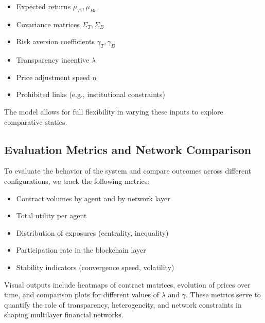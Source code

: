 \begin{itemize}
    \item Expected returns \( \mu_{Ti}, \mu_{Bi} \)
    \item Covariance matrices \( \Sigma_T, \Sigma_B \)
    \item Risk aversion coefficients \( \gamma_T, \gamma_B \)
    \item Transparency incentive \( \lambda \)
    \item Price adjustment speed \( \eta \)
    \item Prohibited links (e.g., institutional constraints)
\end{itemize}

The model allows for full flexibility in varying these inputs to explore comparative statics.

\subsection{Evaluation Metrics and Network Comparison}

To evaluate the behavior of the system and compare outcomes across different configurations, we track the following metrics:

\begin{itemize}
    \item Contract volumes by agent and by network layer
    \item Total utility per agent
    \item Distribution of exposures (centrality, inequality)
    \item Participation rate in the blockchain layer
    \item Stability indicators (convergence speed, volatility)
\end{itemize}

Visual outputs include heatmaps of contract matrices, evolution of prices over time, and comparison plots for different values of \( \lambda \) and \( \gamma \). These metrics serve to quantify the role of transparency, heterogeneity, and network constraints in shaping multilayer financial networks.

